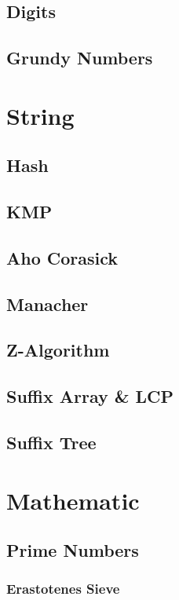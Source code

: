 \documentclass[10pt,a4paper]{report}
\begin{document}
	\section{Digits}
		
	\section{Grundy Numbers}
	
\chapter{String}
	\section{Hash}
	\section{KMP}
	\section{Aho Corasick}
		
	\section{Manacher}
	\section{Z-Algorithm}
	\section{Suffix Array \& LCP}
		
	\section{Suffix Tree}
	
\chapter{Mathematic}
	\section{Prime Numbers}
		\subsection{Erastotenes Sieve}
\end{document}
